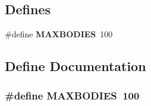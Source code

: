 \subsection*{Defines}
\begin{CompactItemize}
\item 
\#define {\bf MAXBODIES}\ 100
\end{CompactItemize}


\subsection{Define Documentation}
\subsubsection{\setlength{\rightskip}{0pt plus 5cm}\#define MAXBODIES\ 100}\label{geomPQP_8h_a0}


